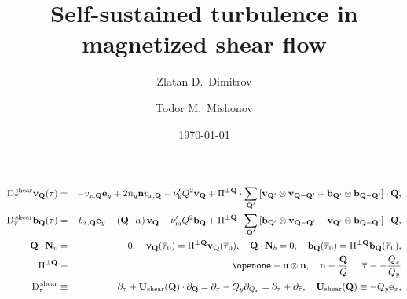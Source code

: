 \documentclass[prb,singlecolumn]{revtex4}
\begin{document}
\title{Self-sustained turbulence in magnetized shear flow}
\author{Zlatan D.~Dimitrov}
\author{Todor M.~Mishonov}

\date{\today}

\maketitle

\begin{eqnarray}
\mathrm{D}_{\overline{\tau}}^{\mathrm{\,shear}}\mathbf{v}_\mathbf{Q}(\tau) &=&
-v_{x,\mathbf{Q}}\mathbf{e}_y + 2n_y\mathbf{n}v_{x,\mathbf{Q}}
-\nu^\prime_\mathrm{k}Q^2\mathbf{v}_\mathbf{Q} + \Pi^{\perp\mathbf{Q}}\cdot\sum_{\mathbf{Q}'}\left[\mathbf{v}_{\mathbf{Q}'}\otimes\mathbf{v}_{\mathbf{Q}
-\mathbf{Q}'} + \mathbf{b}_{\mathbf{Q}'}\otimes\mathbf{b}_{\mathbf{Q}-\mathbf{Q}'}\right]\cdot\mathbf{Q},
\label{VelocityEvolution}
\\
\label{MagneticEvolution}
\mathrm{D}_{\overline{\tau}}^{\mathrm{\,shear}}\mathbf{b}_\mathbf{Q}(\tau) &=& b_{x,\mathbf{Q}}\mathbf{e}_y
-(\mathbf{Q}\cdot{\alpha})\,\mathbf{v}_\mathbf{Q} -\nu'_\mathrm{m}Q^2\mathbf{b}_\mathbf{Q} + \Pi^{\perp\mathbf{Q}}\cdot\sum_{\mathbf{Q}'}\left[\mathbf{b}_{\mathbf{Q}'}\otimes\mathbf{v}_{\mathbf{Q}
-\mathbf{Q}'} - \mathbf{v}_{\mathbf{Q}'}\otimes\mathbf{b}_{\mathbf{Q}-\mathbf{Q}'}\right]\cdot\mathbf{Q}, 
\\
\mathbf{Q} \cdot \mathbf{N}_v &=& 0, \quad \mathbf{v}_\mathbf{Q}(\overline{\tau}_0)=\Pi^{\perp\mathbf{Q}}\mathbf{v}_\mathbf{Q}(\overline{\tau}_0),\quad
\mathbf{Q}\cdot \mathbf{N}_b=0, \quad \mathbf{b}_\mathbf{Q}(\overline{\tau}_0)=\Pi^{\perp\mathbf{Q}}\mathbf{b}_\mathbf{Q}(\overline{\tau}_0),\nonumber 
\\
\Pi^{\perp\mathbf{Q}} &\equiv &\openone-\mathbf{n}\otimes \mathbf{n},\quad \mathbf{n}\equiv \frac{\mathbf{Q}}{Q},\quad \overline{\tau}\equiv-\frac{Q_x}{Q_y}
\\
\label{ushear}
\mathrm{D}_\tau^{\mathrm{\,shear}} &\equiv& \partial_\tau+\mathbf{U}_{\mathrm{shear}}(\mathbf{Q})\cdot\partial_{\mathbf{Q}}=\partial_\tau-Q_y\partial_{Q_x}= \partial_\tau + \partial_{\overline{\tau}},\quad
\mathbf{U}_\mathrm{shear}(\mathbf{Q})\equiv-Q_y\mathbf{e}_x, 
\end{eqnarray}
\end{document}
